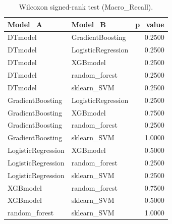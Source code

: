 \begin{table}[t]
\centering
\begin{tabular}{llr}
\toprule
Model_A & Model_B & p_value \\
\midrule
DTmodel & GradientBoosting & 0.2500 \\
DTmodel & LogisticRegression & 0.2500 \\
DTmodel & XGBmodel & 0.2500 \\
DTmodel & random_forest & 0.2500 \\
DTmodel & sklearn_SVM & 0.2500 \\
GradientBoosting & LogisticRegression & 0.2500 \\
GradientBoosting & XGBmodel & 0.7500 \\
GradientBoosting & random_forest & 0.2500 \\
GradientBoosting & sklearn_SVM & 1.0000 \\
LogisticRegression & XGBmodel & 0.5000 \\
LogisticRegression & random_forest & 0.2500 \\
LogisticRegression & sklearn_SVM & 0.2500 \\
XGBmodel & random_forest & 0.7500 \\
XGBmodel & sklearn_SVM & 0.5000 \\
random_forest & sklearn_SVM & 1.0000 \\
\bottomrule
\end{tabular}
\caption{Wilcoxon signed-rank test (Macro_Recall).}
\label{tab:wilcoxon_Macro_Recall}
\end{table}